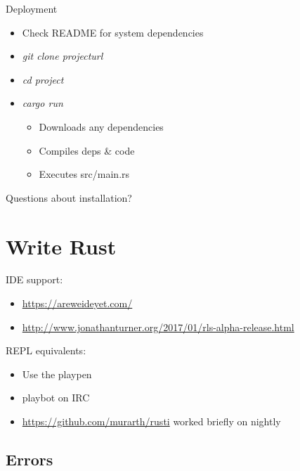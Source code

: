 \documentclass[100pt]{beamer}
\begin{document}
\begin{frame}
    Deployment
    \begin{itemize}
        \item Check README for system dependencies
        \item \textit{git clone projecturl}
        \item \textit{cd project}
        \item \textit{cargo run}
        \begin{itemize}
            \item Downloads any dependencies
            \item Compiles deps \& code
            \item Executes src/main.rs
        \end{itemize}
    \end{itemize}
\end{frame}



\begin{frame}
    Questions about installation?
\end{frame}


\section{Write Rust}

\begin{frame}
    IDE support:
    \begin{itemize}
        \item \url{https://areweideyet.com/}
        \item \url{http://www.jonathanturner.org/2017/01/rls-alpha-release.html}
    \end{itemize}
\end{frame}

\begin{frame}
    REPL equivalents:
    \begin{itemize}
        \item Use the playpen
        \item playbot on IRC
        \item \url{https://github.com/murarth/rusti} worked briefly on nightly
    \end{itemize}
\end{frame}


\subsection{Errors}
\end{document}
